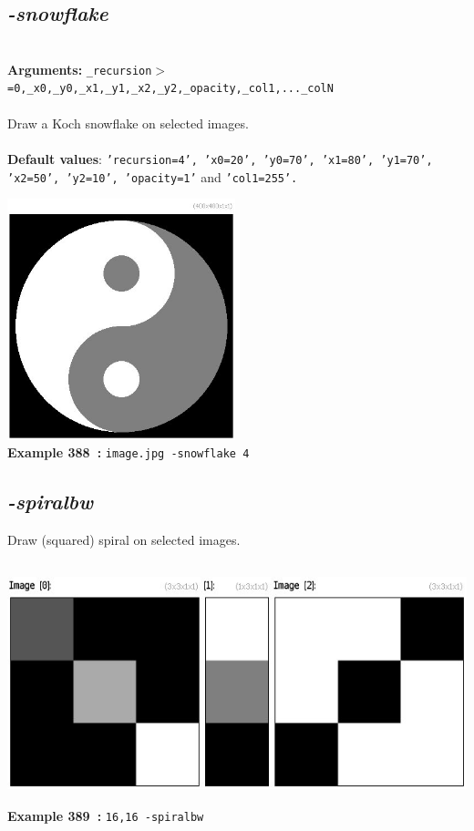 \documentclass[a4paper,11pt,twoside]{book}
\begin{document}
\subsection{\emph{-snowflake} }\vspace*{-0.5em}
~\\\textbf{Arguments: } 
{\small \texttt{\_recursion$>$=0,\_x0,\_y0,\_x1,\_y1,\_x2,\_y2,\_opacity,\_col1,...\_colN}}\\~\\
Draw a Koch snowflake on selected images.
~\\~\\\textbf{Default values}: {\small \texttt{'recursion=4', 'x0=20', 'y0=70', 'x1=80', 'y1=70', 'x2=50', 'y2=10', 'opacity=1'} and \texttt{'col1=255'.}}
\begin{center}\includegraphics[keepaspectratio=true,height=7cm,width=\textwidth]{img/gmic_def388.jpg}\\
{\footnotesize \textbf{Example 388~:} \texttt{image.jpg -snowflake 4}}
\end{center}

\subsection{\emph{-spiralbw} }\vspace*{-0.5em}
Draw (squared) spiral on selected images.
\begin{center}\includegraphics[keepaspectratio=true,height=7cm,width=\textwidth]{img/gmic_def389.jpg}\\
{\footnotesize \textbf{Example 389~:} \texttt{16,16 -spiralbw}}
\end{center}
\end{document}
